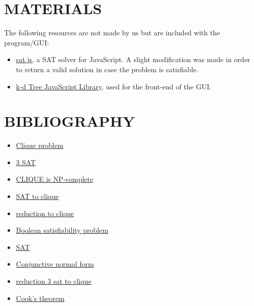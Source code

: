 \documentclass[table]{article}
\begin{document}
\pagebreak
\section{MATERIALS}
The following resources are not made by us but are included with the program/GUI:
\begin{itemize}
    \item\href{https://www.comp.nus.edu.sg/~gregory/sat/sat.js}{sat.js}, a SAT solver for JavaScript. A slight modification was made in order to return a valid solution in case the problem is satisfiable.  
    \item\href{https://github.com/ubilabs/kd-tree-javascript}{k-d Tree JavaScript Library}, used for the front-end of the GUI.
    \end{itemize}
\section{BIBLIOGRAPHY}
\begin{itemize}
\item\href{https://en.wikipedia.org/wiki/Clique_problem}{Clique problem}    
\item\href{http://www.cs.ecu.edu/karl/6420/spr16/Notes/NPcomplete/3sat.html}{3 SAT}    
\item\href{https://www.geeksforgeeks.org/proof-that-clique-decision-problem-is-np-complete}{CLIQUE is NP-complete}    
\item\href{https://opendsa-server.cs.vt.edu/ODSA/Books/Everything/html/threeSAT_to_clique.html}{SAT to clique}    
\item\href{https://paperzz.com/doc/7301675/3sat-reduction-to-clique}{reduction to clique} 
\item\href{https://en.wikipedia.org/wiki/Boolean_satisfiability_problem}{Boolean satisfiability problem}
\item\href{https://www.cs.umd.edu/~gasarch/TOPICS/sat/SATtalk.pdf}{SAT}
\item\href{https://logic4free.informatik.uni-kiel.de/llocs/Conjunctive_normal_form_(propositional_logic)}{Conjunctive normal form}
\item\href{https://cs.stackexchange.com/questions/70531/reduction-3sat-and-clique}{reduction 3 sat to clique}
\item\href{https://dl.acm.org/doi/10.1145/800157.805047}{Cook's theorem}
\end{itemize}
\end{document}
